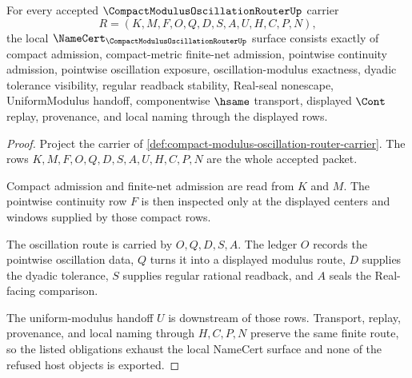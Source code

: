 \begin{theorem}
\label{thm:compact-modulus-oscillation-router-namecert-obligations}
For every accepted $\CompactModulusOscillationRouterUp$ carrier
$$
R=(K,M,F,O,Q,D,S,A,U,H,C,P,N),
$$
the local $\NameCert_{\CompactModulusOscillationRouterUp}$ surface consists exactly of compact admission, compact-metric finite-net admission, pointwise continuity admission, pointwise oscillation exposure, oscillation-modulus exactness, dyadic tolerance visibility, regular readback stability, Real-seal nonescape, UniformModulus handoff, componentwise $\hsame$ transport, displayed $\Cont$ replay, provenance, and local naming through the displayed rows.
\end{theorem}
\begin{proof}
Project the carrier of \autoref{def:compact-modulus-oscillation-router-carrier}. The rows $K,M,F,O,Q,D,S,A,U,H,C,P,N$ are the whole accepted packet.

Compact admission and finite-net admission are read from $K$ and $M$. The pointwise continuity row $F$ is then inspected only at the displayed centers and windows supplied by those compact rows.

The oscillation route is carried by $O,Q,D,S,A$. The ledger $O$ records the pointwise oscillation data, $Q$ turns it into a displayed modulus route, $D$ supplies the dyadic tolerance, $S$ supplies regular rational readback, and $A$ seals the Real-facing comparison.

The uniform-modulus handoff $U$ is downstream of those rows. Transport, replay, provenance, and local naming through $H,C,P,N$ preserve the same finite route, so the listed obligations exhaust the local NameCert surface and none of the refused host objects is exported.
\end{proof}

